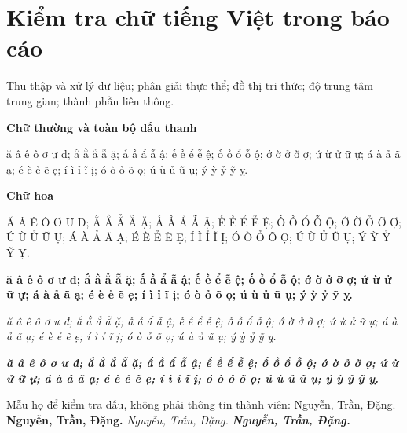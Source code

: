 \documentclass[12pt,a4paper]{report}
\newcommand{\GlyphSample}{ă â ê ô ơ ư đ; ắ ằ ẳ ẵ ặ; ấ ầ ẩ ẫ ậ; ế ề ể ễ ệ; ố ồ ổ ỗ ộ; ớ ờ ở ỡ ợ; ứ ừ ử ữ ự; á à ả ã ạ; é è ẻ ẽ ẹ; í ì ỉ ĩ ị; ó ò ỏ õ ọ; ú ù ủ ũ ụ; ý ỳ ỷ ỹ ỵ.}
\newcommand{\UpperSample}{Ă Â Ê Ô Ơ Ư Đ; Ắ Ằ Ẳ Ẵ Ặ; Ấ Ầ Ẩ Ẫ Ậ; Ế Ề Ể Ễ Ệ; Ố Ồ Ổ Ỗ Ộ; Ớ Ờ Ở Ỡ Ợ; Ứ Ừ Ử Ữ Ự; Á À Ả Ã Ạ; É È Ẻ Ẽ Ẹ; Í Ì Ỉ Ĩ Ị; Ó Ò Ỏ Õ Ọ; Ú Ù Ủ Ũ Ụ; Ý Ỳ Ỷ Ỹ Ỵ.}
\begin{document}
\chapter*{Kiểm tra chữ tiếng Việt trong báo cáo}
Thu thập và xử lý dữ liệu; phân giải thực thể; đồ thị tri thức;
độ trung tâm trung gian; thành phần liên thông.

\textbf{Chữ thường và toàn bộ dấu thanh}\par
\GlyphSample

\textbf{Chữ hoa}\par
\UpperSample

\textbf{\GlyphSample}

\textit{\GlyphSample}

\textbf{\textit{\GlyphSample}}

Mẫu họ để kiểm tra dấu, không phải thông tin thành viên: Nguyễn, Trần, Đặng.
\textbf{Nguyễn, Trần, Đặng.} \textit{Nguyễn, Trần, Đặng.}
\textbf{\textit{Nguyễn, Trần, Đặng.}}

\begin{center}
\end{center}
\end{document}

